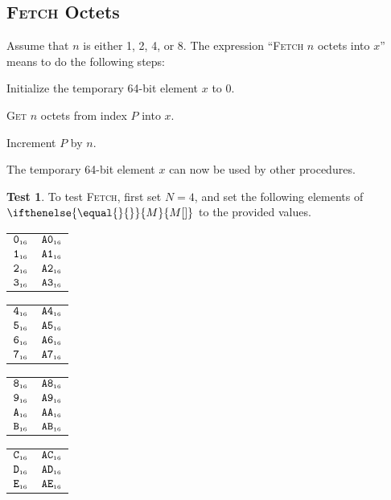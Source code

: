 \documentclass[a4paper,12pt]{article}
\makeatletter
\newcommand{\num}[1]{\texttt{#1}}
\newcommand{\hex}[1]{\num{#1}_{\textup{\tiny 16}}}
\newcommand{\MEM}[1]{\ifthenelse{\equal{#1}{}}{M}{M[#1]}}
\newcommand{\PC}{P}
\newcommand{\proc}[1]{\textsc{#1}}
\theoremstyle{definition}
\newtheorem{test}{Test}
\newenvironment{memtable}{%
  \begin{trivlist}
    \item
    }{%
    \end{trivlist}}
\newenvironment{memcolumn}{%
  \begin{tabular}{@{}ll@{}}
    \hline}
    {%
    \hline
  \end{tabular}}
\newcommand{\memspace}{\qquad}
\makeatother
\begin{document}
\subsection{\proc{Fetch} Octets}

Assume that $n$ is either 1, 2, 4, or 8.
The expression ``\proc{Fetch} $n$ octets into $x$'' means to do the following steps:
\begin{stepnumbers}
\item Initialize the temporary 64-bit element $x$ to 0.
\item \proc{Get} $n$ octets from index $\PC$ into $x$.
\item Increment $\PC$ by $n$.
\end{stepnumbers}
The temporary 64-bit element $x$ can now be used by other procedures.

\begin{test}
  To test \proc{Fetch}, first set $N=4$, and set the following elements of $\MEM{}$ to the provided values.
  \begin{memtable}
    \begin{memcolumn}
      $\hex{0}$ & $\hex{A0}$ \\
      $\hex{1}$ & $\hex{A1}$ \\
      $\hex{2}$ & $\hex{A2}$ \\
      $\hex{3}$ & $\hex{A3}$ \\
    \end{memcolumn}
    \memspace
    \begin{memcolumn}
      $\hex{4}$ & $\hex{A4}$ \\
      $\hex{5}$ & $\hex{A5}$ \\
      $\hex{6}$ & $\hex{A6}$ \\
      $\hex{7}$ & $\hex{A7}$ \\
    \end{memcolumn}
    \memspace
    \begin{memcolumn}
      $\hex{8}$ & $\hex{A8}$ \\
      $\hex{9}$ & $\hex{A9}$ \\
      $\hex{A}$ & $\hex{AA}$ \\
      $\hex{B}$ & $\hex{AB}$ \\
    \end{memcolumn}
    \memspace
    \begin{memcolumn}
      $\hex{C}$ & $\hex{AC}$ \\
      $\hex{D}$ & $\hex{AD}$ \\
      $\hex{E}$ & $\hex{AE}$ \\

\end{memcolumn}
\end{memtable}
\end{test}
\end{document}
